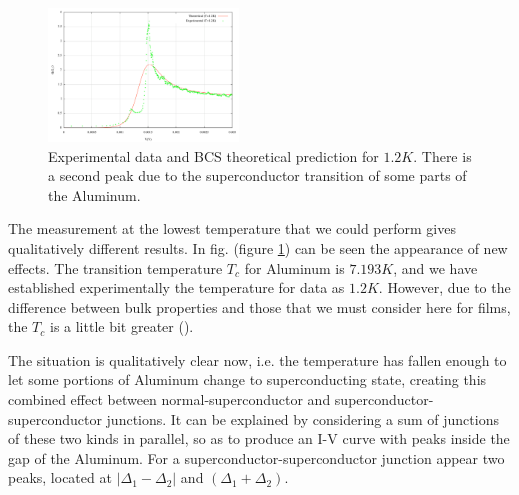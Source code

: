 \begin{figure}[h!]
\centering
\includegraphics[width=0.45\textwidth]{gv_theo_exp_10}
\caption{\small Experimental data and BCS theoretical prediction for $1.2 K$. There is a second peak due to the superconductor transition of some parts of the Aluminum.
\label{gv_theo_exp_10}}
\end{figure}

The measurement at the lowest temperature that we could perform gives qualitatively different results. In fig. (figure \ref{gv_theo_exp_10}) can be seen the appearance of new effects. The transition temperature $T_c$ for Aluminum is $7.193 K$, and we have established experimentally the temperature for data as $1.2 K$. However, due to the difference between bulk properties and those that we must consider here for films, the $T_c$ is a little bit greater ().

The situation is qualitatively clear now, i.e. the temperature has fallen enough to let some portions of Aluminum change to superconducting state, creating this combined effect between normal-superconductor and superconductor-superconductor junctions. It can be explained by considering a sum of junctions of these two kinds in parallel, so as to produce an I-V curve with peaks inside the gap of the Aluminum. For a superconductor-superconductor junction appear two peaks, located at $| \Delta_1-\Delta_2|$ and $(\Delta_1+\Delta_2)$.

